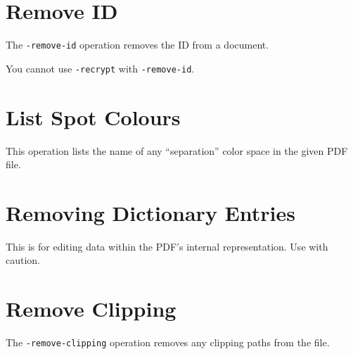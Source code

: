 \documentclass{book}
\begin{document}
\section{Remove ID}
  The \texttt{-remove-id} operation removes the ID from a document.

\noindent{}

You cannot use \texttt{-recrypt} with \texttt{-remove-id}.

\section{List Spot Colours}

This operation lists the name of any ``separation'' color space in the given PDF file.

\noindent{}

\section{Removing Dictionary Entries}

This is for editing data within the PDF's internal representation. Use with caution.

\noindent{}


\section{Remove Clipping}


The \texttt{-remove-clipping} operation removes any clipping paths from the file.
\end{document}
